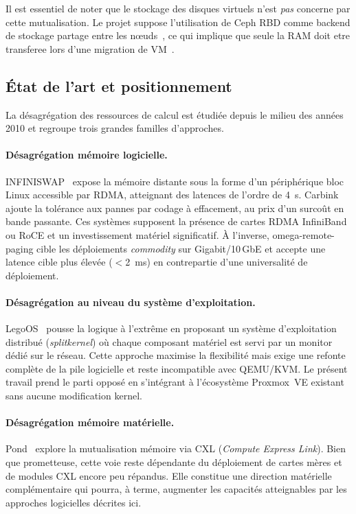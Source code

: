 Il est essentiel de noter que le stockage des disques virtuels n'est \textit{pas} concerne par cette mutualisation. Le projet suppose l'utilisation de Ceph RBD comme backend de stockage partage entre les n\oe{}uds~\cite{ceph_doc}, ce qui implique que seule la RAM doit etre transferee lors d'une migration de VM~\cite{clark_2005}.

\subsection{État de l'art et positionnement}
\label{subsec:etat-de-l-art}

La désagrégation des ressources de calcul est étudiée depuis le milieu des années 2010 et regroupe trois grandes familles d'approches.

\paragraph{Désagrégation mémoire logicielle.}
INFINISWAP~\cite{gu_2017_infiniswap} expose la mémoire distante sous la forme d'un périphérique bloc Linux accessible par RDMA, atteignant des latences de l'ordre de 4~\textmu{}s. Carbink~\cite{zhou_2022_carbink} ajoute la tolérance aux pannes par codage à effacement, au prix d'un surcoût en bande passante. Ces systèmes supposent la présence de cartes RDMA InfiniBand ou RoCE et un investissement matériel significatif. À l'inverse, omega-remote-paging cible les déploiements \textit{commodity} sur Gigabit/10\,GbE et accepte une latence cible plus élevée ($<$2~ms) en contrepartie d'une universalité de déploiement.

\paragraph{Désagrégation au niveau du système d'exploitation.}
LegoOS~\cite{shan_2018_legoos} pousse la logique à l'extrême en proposant un système d'exploitation distribué (\textit{splitkernel}) où chaque composant matériel est servi par un monitor dédié sur le réseau. Cette approche maximise la flexibilité mais exige une refonte complète de la pile logicielle et reste incompatible avec QEMU/KVM. Le présent travail prend le parti opposé en s'intégrant à l'écosystème Proxmox~VE existant sans aucune modification kernel.

\paragraph{Désagrégation mémoire matérielle.}
Pond~\cite{li_2023_pond} explore la mutualisation mémoire via CXL (\textit{Compute Express Link}). Bien que prometteuse, cette voie reste dépendante du déploiement de cartes mères et de modules CXL encore peu répandus. Elle constitue une direction matérielle complémentaire qui pourra, à terme, augmenter les capacités atteignables par les approches logicielles décrites ici.

